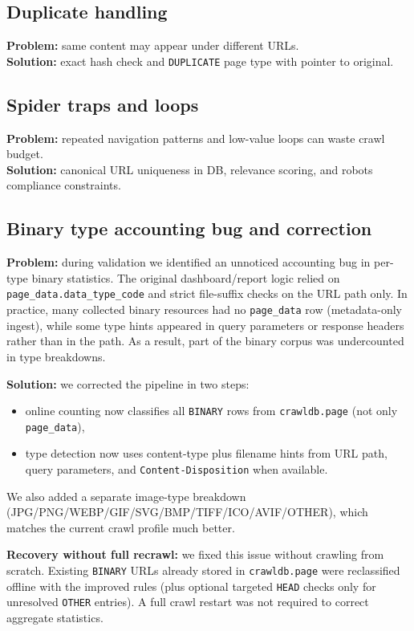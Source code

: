 \documentclass[9pt]{IEEEtran}
\begin{document}
\subsection{Duplicate handling}
\textbf{Problem:} same content may appear under different URLs.\\
\textbf{Solution:} exact hash check and \texttt{DUPLICATE} page type with pointer to original.

\subsection{Spider traps and loops}
\textbf{Problem:} repeated navigation patterns and low-value loops can waste crawl budget.\\
\textbf{Solution:} canonical URL uniqueness in DB, relevance scoring, and robots compliance constraints.

\subsection{Binary type accounting bug and correction}
\textbf{Problem:} during validation we identified an unnoticed accounting bug in per-type binary statistics. The original dashboard/report logic relied on \texttt{page\_data.data\_type\_code} and strict file-suffix checks on the URL path only. In practice, many collected binary resources had no \texttt{page\_data} row (metadata-only ingest), while some type hints appeared in query parameters or response headers rather than in the path. As a result, part of the binary corpus was undercounted in type breakdowns.

\textbf{Solution:} we corrected the pipeline in two steps:
\begin{itemize}
    \item online counting now classifies all \texttt{BINARY} rows from \texttt{crawldb.page} (not only \texttt{page\_data}),
    \item type detection now uses content-type plus filename hints from URL path, query parameters, and \texttt{Content-Disposition} when available.
\end{itemize}

We also added a separate image-type breakdown (JPG/PNG/WEBP/GIF/SVG/BMP/TIFF/ICO/AVIF/OTHER), which matches the current crawl profile much better.

\textbf{Recovery without full recrawl:} we fixed this issue without crawling from scratch. Existing \texttt{BINARY} URLs already stored in \texttt{crawldb.page} were reclassified offline with the improved rules (plus optional targeted \texttt{HEAD} checks only for unresolved \texttt{OTHER} entries). A full crawl restart was not required to correct aggregate statistics.
\end{document}
